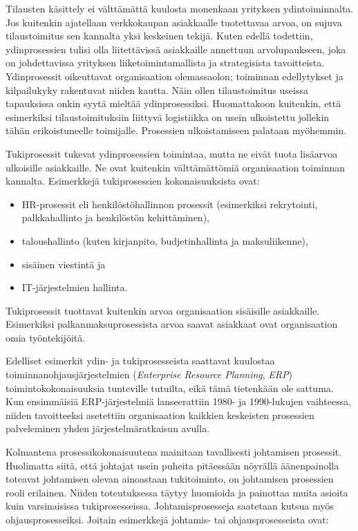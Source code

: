 \documentclass[
  finnish,
  letterpaper,
  DIV=11,
  numbers=noendperiod,
  oneside]{scrreprt}
\providecommand{\tightlist}{%
  \setlength{\itemsep}{0pt}\setlength{\parskip}{0pt}}
\begin{document}
Tilausten käsittely ei välttämättä kuulosta monenkaan yrityksen
ydintoiminnalta. Jos kuitenkin ajatellaan verkkokaupan asiakkaalle
tuotettavaa arvoa, on sujuva tilaustoimitus sen kannalta yksi keskeinen
tekijä. Kuten edellä todettiin, ydinprosessien tulisi olla liitettävissä
asiakkaille annettuun arvolupaukseen, joka on johdettavissa yrityksen
liiketoimintamallista ja strategisista tavoitteista. Ydinprosessit
oikeuttavat organisaation olemassaolon; toiminnan edellytykset ja
kilpailukyky rakentuvat niiden kautta. Näin ollen tilaustoimitus useissa
tapauksissa onkin syytä mieltää ydinprosessiksi. Huomattakoon kuitenkin,
että esimerkiksi tilaustoimituksiin liittyvä logistiikka on usein
ulkoistettu jollekin tähän erikoistuneelle toimijalle. Prosessien
ulkoistamiseen palataan myöhemmin.

Tukiprosessit tukevat ydinprosessien toimintaa, mutta ne eivät tuota
lisäarvoa ulkoisille asiakkaille. Ne ovat kuitenkin välttämättömiä
organisaation toiminnan kannalta. Esimerkkejä tukiprosessien
kokonaisuuksista ovat:

\begin{itemize}
\tightlist
\item
  HR-prosessit eli henkilöstöhallinnon prosessit (esimerkiksi
  rekrytointi, palkkahallinto ja henkilöstön kehittäminen),
\item
  taloushallinto (kuten kirjanpito, budjetinhallinta ja maksuliikenne),
\item
  sisäinen viestintä ja
\item
  IT-järjestelmien hallinta.
\end{itemize}

Tukiprosessit tuottavat kuitenkin arvoa organisaation sisäisille
asiakkaille. Esimerkiksi palkanmaksuprosessista arvoa saavat asiakkaat
ovat organisaation omia työntekijöitä.

Edelliset esimerkit ydin- ja tukiprosesseista saattavat kuulostaa
toiminnanohjausjärjestelmien (\emph{Enterprise Resource Planning},
\emph{ERP}) toimintokokonaisuuksia tunteville tutuilta, eikä tämä
tietenkään ole sattuma. Kun ensimmäisiä ERP-järjestelmiä lanseerattiin
1980- ja 1990-lukujen vaihteessa, niiden tavoitteeksi asetettiin
organisaation kaikkien keskeisten prosessien palveleminen yhden
järjestelmäratkaisun avulla.

Kolmantena prosessikokonaisuutena mainitaan tavallisesti johtamisen
prosessit. Huolimatta siitä, että johtajat usein puheita pitäessään
nöyrällä äänenpainolla toteavat johtamisen olevan ainoastaan
tukitoiminto, on johtamisen prosessien rooli erilainen. Niiden
toteutuksessa täytyy huomioida ja painottaa muita asioita kuin
varsinaisissa tukiprosesseissa. Johtamisprosesseja saatetaan kutsua myös
ohjausprosesseiksi. Joitain esimerkkejä johtamis- tai ohjausprosesseista
ovat:
\end{document}
